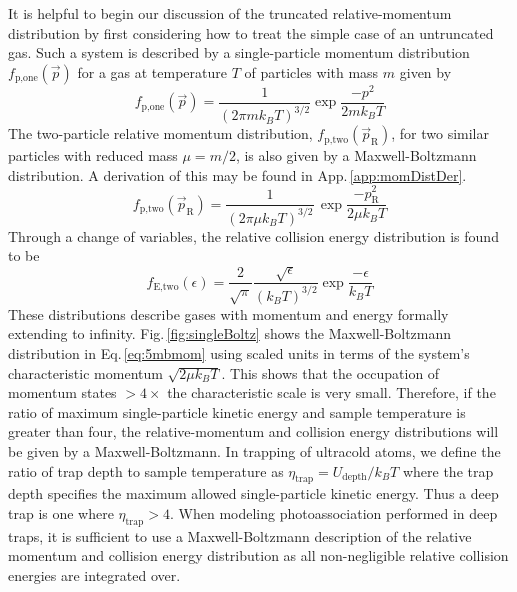 It is helpful to begin our discussion of the truncated relative-momentum distribution by first considering how to treat the simple case of an untruncated gas.
Such a system is described by a single-particle momentum distribution $f_\text{p,one}(\vec{p})$ for a gas at temperature $T$ of particles with mass $m$ given by 
\begin{equation}  \label{eq:5single_particle_prob}
		 f_\text{p,one}( \vec{p} ) = \frac{1}{(2 \pi m k_B T)^{3/2}} \exp{\frac{-p^2}{2 m k_B T}}
\end{equation}
The two-particle relative momentum distribution, $f_\text{p,two}(\vec{p}_\text{R})$, for two similar particles with reduced mass $\mu = m/2$, is also given by a Maxwell-Boltzmann distribution.
A derivation of this may be found in App.\,\ref{app:momDistDer}.
\begin{equation} \label{eq:5mbmom}
	 f_\text{p,two}( \vec{p}_\text{R} ) = \frac{1}{\left( 2 \pi \mu k_B T \right)^{3/2}}\,\exp{\frac{-p_\text{R}^2}{2 \mu k_B T}}
\end{equation}
Through a change of variables, the relative collision energy distribution is found to be
\begin{equation} \label{eq:5mben}
	 f_\text{E,two}( \epsilon ) = \frac{2}{\sqrt{\pi}} \frac{\sqrt{\epsilon}}{(k_B T)^{3/2}} \exp{\frac{-\epsilon}{k_B T}}
\end{equation}
These distributions describe gases with momentum and energy formally extending to infinity.
Fig.\,\ref{fig:singleBoltz} shows the Maxwell-Boltzmann distribution in Eq.\,\ref{eq:5mbmom} using scaled units in terms of the system's characteristic momentum $\sqrt{2 \mu k_B T}$.
This shows that the occupation of momentum states $>\!4\!\times$ the characteristic scale is very small.
Therefore, if the ratio of maximum single-particle kinetic energy and sample temperature is greater than four, the relative-momentum and collision energy distributions will be given by a Maxwell-Boltzmann.
In trapping of ultracold atoms, we define the ratio of trap depth to sample temperature as $\eta_\text{trap} = U_\text{depth}/k_B T$ where the trap depth specifies the maximum allowed single-particle kinetic energy.
Thus a deep trap is one where $\eta_\text{trap} > 4$.
When modeling photoassociation performed in deep traps, it is sufficient to use a Maxwell-Boltzmann description of the relative momentum and collision energy distribution as all non-negligible relative collision energies are integrated over.

